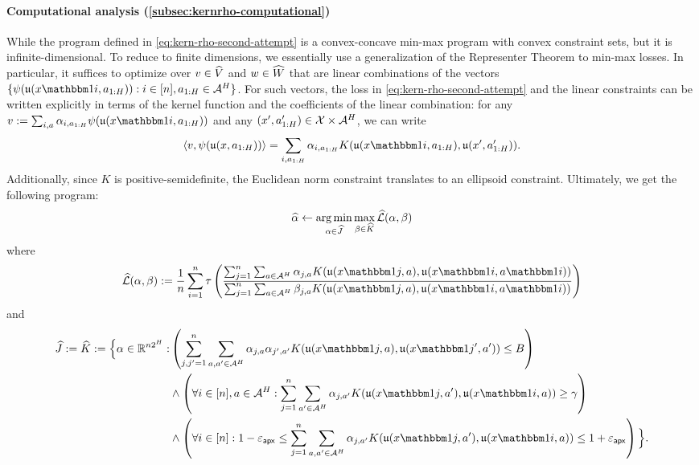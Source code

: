 \paragraph{Computational analysis (\cref{subsec:kernrho-computational})} While the program defined in \cref{eq:kern-rho-second-attempt} is a convex-concave min-max program with convex constraint sets, but it is infinite-dimensional. To reduce to finite dimensions, we essentially use a generalization of the Representer Theorem to min-max losses. In particular, it suffices to optimize over $v \in \widehat{V}$ and $w \in \widehat{W}$ that are linear combinations of the vectors $\{\psi(\uf(x\ind{i},a_{1:H})): i \in [n], a_{1:H}\in \MA^H\}$. For such vectors, the loss in \cref{eq:kern-rho-second-attempt} and the linear constraints can be written explicitly in terms of the kernel function and the coefficients of the linear combination: for any $v := \sum_{i,a} \alpha_{i,a_{1:H}} \psi(\uf(x\ind{i},a_{1:H}))$ and any $(x',a'_{1:H}) \in \mathcal{X}\times\mathcal{A}^H$, we can write
\[\langle v, \psi(\uf(x,a_{1:H}))\rangle = \sum_{i,a_{1:H}} \alpha_{i,a_{1:H}} K(\uf(x\ind{i},a_{1:H}),\uf(x',a'_{1:H})).\]
Additionally, since $K$ is positive-semidefinite, the Euclidean norm constraint translates to an ellipsoid constraint. Ultimately, we get the following program:
\begin{equation}
\widehat{\alpha} \gets \operatorname*{arg\,min}_{\alpha \in \widehat{J}} \max_{\beta \in \widehat{K}} \mathcal{\widehat{L}}(\alpha,\beta)
\label{eq:kern-rho-finite}
\end{equation}
where
\[\emploss(\alpha,\beta) := \frac{1}{n}\sum_{i=1}^n \tau \left( \frac{\sum_{j=1}^n \sum_{a \in \MA^H} \alpha_{j,a} K(\uop{x\ind{j}}{a}, \uop{x\ind{i}}{a\ind{i}})}{\sum_{j=1}^n \sum_{a \in \MA^H} \beta_{j,a} K(\uop{x\ind{j}}{a}, \uop{x\ind{i}}{a\ind{i}})}\right)\]
and
\begin{align}
\wh J := \wh K := \Big\{ \alpha \in \RR^{n2^H}: &\left(\sum_{j,j'=1}^n \sum_{a,a' \in \MA^H} \alpha_{j,a}\alpha_{j',a'}K(\uop{x\ind{j}}{a},\uop{x\ind{j'}}{a'}) \leq B \right) \\
&\land \left(\forall i \in [n],a\in\MA^H: \sum_{j=1}^n \sum_{a' \in \MA^H} \alpha_{j,a'} K(\uop{x\ind{j}}{a'},\uop{x\ind{i}}{a}) \geq \gamma\right) \\ 
&\land \left(\forall i \in [n]: 1-\epapx \leq \sum_{j=1}^n \sum_{a,a' \in \MA^H} \alpha_{j,a'} K(\uop{x\ind{j}}{a'},\uop{x\ind{i}}{a}) \leq 1+\epapx\right)\Big\}.
\end{align}
